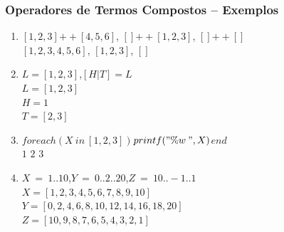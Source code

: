 \begin{frame}[fragile]
\frametitle{Operadores de Termos Compostos -- Exemplos}

    \begin{exampleblock}{}
		
        \begin{enumerate}
        
			\item $[1,2,3]$\:$++$\:$[4,5,6]$, \: $[]$\:$++$\:$[1,2,3]$, \: $[]$\:$++$\:$[]$\\
            \pause
            $[1,2,3,4,5,6]$, \:$[1,2,3]$, \:$[]$
            \medskip
            \pause
            
            \item $L = [1,2,3]$,\:\:$[H|T] = L$\\
            \pause
            $L = [1,2,3]$\\ \pause
            $H = 1$\\ \pause
            $T = [2,3]$
            \medskip
            \pause
            
            \item $foreach(X\:in\:[1,2,3])$\:\:$printf("\%w\:",X)$\:\:$end$\\
            \pause
            $1$ $2$ $3$
            \medskip
            \pause
            \item $X\:=\:1..10$,\:\:$Y\:=\:0..2..20$,\:\:$Z\:=\:10..-1..1$\\
            
            \pause
            $X = [1,2,3,4,5,6,7,8,9,10]$\\ 
            
            \pause
            $Y = [0,2,4,6,8,10,12,14,16,18,20]$\\
             \pause
            $Z = [10,9,8,7,6,5,4,3,2,1]$
            
		\end{enumerate}
        
	\end{exampleblock}
    
\end{frame}

